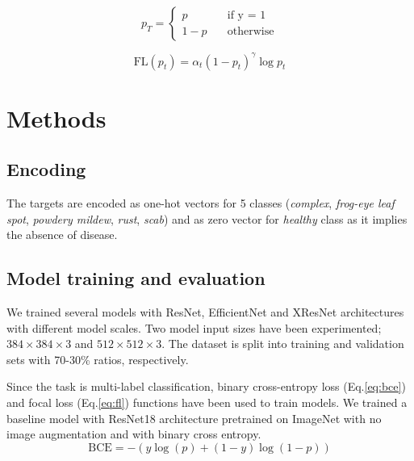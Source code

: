 \documentclass[conference]{IEEEtran}
\begin{document}
\begin{equation*}
    p_T = 
    \begin{cases}
        p &\quad \text{if y = 1} \\
        1 - p &\quad \text{otherwise}
    \end{cases}
\end{equation*}

\begin{equation}
    \text{FL}(p_t) = \alpha_t (1 - p_t)^{\gamma}\log{p_t} \label{eq:fl}
\end{equation}

\section{Methods}

\subsection{Encoding}
The targets are encoded as one-hot vectors for 5 classes 
(\textit{complex}, \textit{frog-eye leaf spot}, \textit{powdery mildew}, 
\textit{rust}, \textit{scab}) and 
as zero vector for \textit{healthy} class as it implies the absence of disease.

\subsection{Model training and evaluation}
We trained several models with ResNet, EfficientNet and XResNet architectures 
with different model scales. Two model input sizes have been experimented; 
$384 \times 384 \times 3$ and $512 \times 512 \times 3$. 
The dataset is split into training and validation sets with 70-30\% ratios, respectively.

Since the task is multi-label classification, binary cross-entropy loss (Eq.\ref{eq:bce})
and focal loss (Eq.\ref{eq:fl}) functions have been used to train models. 
We trained a baseline model with ResNet18 architecture pretrained on ImageNet 
with no image augmentation and with binary cross entropy. 
\begin{equation*}
    \text{BCE} = -{(y\log(p) + (1 - y)\log(1 - p))} \label{eq:bce}
\end{equation*}
\end{document}
